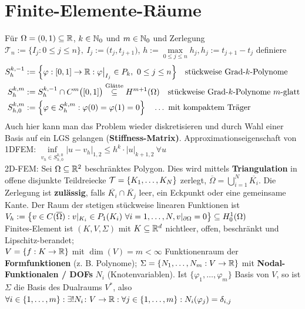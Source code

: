 \documentclass[12pt]{scrartcl}
\begin{document}
	\section{Finite-Elemente-Räume}

	Für $\Omega=(0,1)\subseteq\mathbb{R}$, $k\in\mathbb{N}_0$ und $m\in\mathbb{N}_0$ und Zerlegung $\mathcal{T}_n:=\big\lbrace I_j:0\leq j\leq n\big\rbrace,~I_j:=\big(t_j,t_{j+1}\big)$, $h:=\max\limits_{0\leq j\leq n} h_j,h_j:=t_{j+1}-t_j$ definiere
	\begin{align*}
		S_h^{k,-1}&:=\Big\lbrace\varphi:[0,1]\to\mathbb{R}:\varphi\big|_{I_j}\in P_k,~0\leq j\leq n\Big\rbrace
		\quad\text{stückweise Grad-$k$-Polynome}\\
		S_h^{k,m}&:=S_h^{k,-1}\cap C^m\big([0,1]\big)\overset{\text{Glätte}}{\subseteq} H^{m+1}(\Omega)
		\quad\text{stückweise Grad-$k$-Polynome $m$-glatt}\\
		S_{h,0}^{k,m}&:=\Big\lbrace\varphi\in S_h^{k,m}:\varphi(0)=\varphi(1)=0\Big\rbrace
		\quad\ldots\text{ mit kompaktem Träger}
	\end{align*}
	Auch hier kann man das Problem wieder diskretisieren und durch Wahl einer Basis auf ein LGS gelangen (\textbf{Stiffness-Matrix)}. Approximationseigenschaft von 1DFEM: $\inf\limits_{v_h\in S_{h,0}^{k,0}}\big|u-v_h\big|_{1,2}\leq h^k\cdot|u|_{k+1,2}~\forall u$\\%
	2D-FEM: Sei $\Omega\subseteq\mathbb{R}^2$ beschränktes Polygon.
	Dies wird mittels \textbf{Triangulation} in offene disjunkte Teildreiecke $\mathcal{T}=\lbrace K_1,\ldots,K_N\rbrace$ zerlegt, $\overline{\Omega}=\bigcup_{i=1}^N\overline{K_i}$. 
	Die Zerlegung ist \textbf{zulässig}, falls $\overline{K_i}\cap\overline{K_j}$ leer, ein Eckpunkt oder eine gemeinsame Kante.
	Der Raum der stetigen stückweise linearen Funktionen ist\\
	$V_h:=\left\lbrace
	v\in C(\overline{\Omega}) : v|_{K_i}\in P_1(K_i)~\forall i=1,\ldots,N,\\
	v|_{\partial\Omega}=0\right\rbrace\subseteq H^1_0(\Omega)$\\
	Finites-Element ist $(K,V,\Sigma)$ mit $K\subseteq\mathbb{R}^d$ nichtleer, offen, beschränkt und Lipschitz-berandet; \\$V=\lbrace f:K\to\mathbb{R}\rbrace$ mit $\dim(V)=m<\infty$ Funktionenraum der \textbf{Formfunktionen} (z. B. Polynome); $\Sigma=\lbrace N_1,\ldots,N_m:V\to\mathbb{R}\rbrace$ mit \textbf{Nodal-Funktionalen / DOFs} $N_i$ (Knotenvariablen).
	Ist $\lbrace\varphi_1,\ldots,\varphi_m\rbrace$ Basis von $V$, so ist $\Sigma$ die Basis des Dualraums $V^\ast$, also $\forall i\in\lbrace 1,\ldots,m\rbrace:\exists! N_i\colon V\to\mathbb{R}:\forall j\in\lbrace1,\ldots,m\rbrace: N_i(\varphi_j)=\delta_{i,j}$\\
\end{document}
